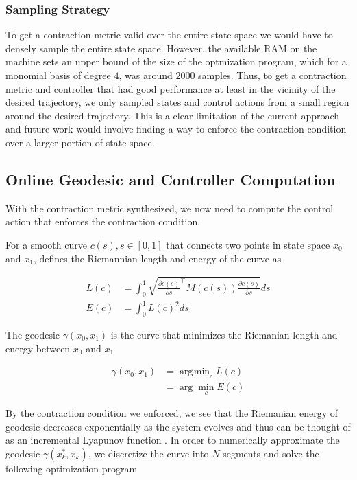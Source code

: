 \documentclass[journal]{IEEEtran}
\DeclareMathOperator*{\argmin}{\arg\!\min}
\begin{document}
\subsubsection{Sampling Strategy}
To get a contraction metric valid over the entire state space we would have to densely sample the entire state space. However, the available RAM on the machine sets an upper bound of the size of the optmization program, which for a monomial basis of degree $4$, was around $2000$ samples. Thus, to get a contraction metric and controller that had good performance at least in the vicinity of the desired trajectory, we only sampled states and control actions from a small region around the desired trajectory. This is a clear limitation of the current approach and future work would involve finding a way to enforce the contraction condition over a larger portion of state space.

\subsection{Online Geodesic and Controller Computation}
With the contraction metric synthesized, we now need to compute the control action that enforces the contraction condition.

For a smooth curve $c(s), s\in [0, 1]$ that connects two points in state space $x_0$ and $x_1$, \autocite{manchesterControlContractionMetrics2017} defines the Riemannian length and energy of the curve as

\begin{equation}
	\begin{aligned}
		L(c) &= \int_0^1 \sqrt{\frac{\partial{c(s)}}{\partial{s}} ^\top M(c(s)) \frac{\partial{c(s)}}{\partial{s}}} ds \\
		E(c) &= \int_0^1 L(c)^2 ds
	\end{aligned}
\end{equation}

The geodesic $\gamma(x_0, x_1)$ is the curve that minimizes the Riemanian length and energy between $x_0$ and $x_1$

\begin{equation}
	\label{eq:geodesic}
	\begin{aligned}
		\gamma(x_0, x_1) &= \argmin_{c} L(c) \\
		&= \arg \min_{c} E(c)
	\end{aligned}
\end{equation}

By the contraction condition we enforced, we see that the Riemanian energy of geodesic decreases exponentially as the system evolves and thus can be thought of as an incremental Lyapunov function \autocite{manchesterControlContractionMetrics2017}. In order to numerically approximate the geodesic $\gamma(x^*_k, x_k)$, we discretize the curve into $N$ segments and solve the following optimization program
\end{document}
